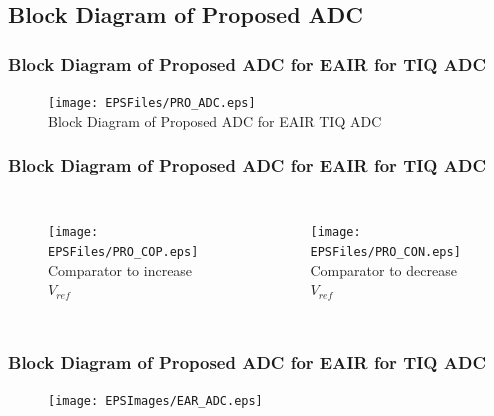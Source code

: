\subsection*{Block Diagram of Proposed ADC}
\begin{frame}
	\frametitle{Block Diagram of Proposed ADC for EAIR for TIQ ADC}
	\begin{center}
		\begin{figure}
		\texttt{[image: EPSFiles/PRO\_ADC.eps]}\\
		\small{Block Diagram of Proposed ADC for EAIR TIQ ADC}
		\end{figure}	
	\end{center}
\end{frame}
\begin{frame}
	\frametitle{Block Diagram of Proposed ADC for EAIR for TIQ ADC}
	\begin{center}
		\begin{columns}[c]
		\column{2.5in}
			\begin{figure}
			\texttt{[image: EPSFiles/PRO\_COP.eps]}\\
			\small{Comparator to increase $V_{ref}$}
			\end{figure}	
		\column{2.5in}
			\begin{figure}
			\texttt{[image: EPSFiles/PRO\_CON.eps]}\\
			\small{Comparator to decrease $V_{ref}$}
			\end{figure}
		\end{columns}
	\end{center}
\end{frame}
\begin{frame}
	\frametitle{Block Diagram of Proposed ADC for EAIR for TIQ ADC}
	\begin{center}
		\begin{figure}
		\texttt{[image: EPSImages/EAR\_ADC.eps]}\\
		\end{figure}	
	\end{center}
\end{frame}


